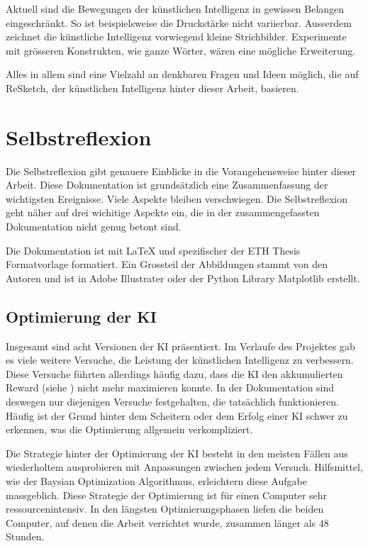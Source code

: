 Aktuell sind die Bewegungen der künstlichen Intelligenz in
gewissen Belangen eingeschränkt. So ist beispielsweise die Druckstärke nicht
variierbar. Ausserdem zeichnet die künstliche Intelligenz vorwiegend kleine
Strichbilder. Experimente mit grösseren Konstrukten, wie ganze Wörter, wären
eine mögliche Erweiterung. 

Alles in allem sind eine Vielzahl an denkbaren Fragen und Ideen möglich, die auf
ReSketch, der künstlichen Intelligenz hinter dieser Arbeit, basieren.


\section{Selbstreflexion}\label{chap:d_reflex} Die Selbstreflexion gibt genauere
Einblicke in die Vorangehensweise hinter dieser Arbeit. Diese Dokumentation ist
grundsätzlich eine Zusammenfassung der wichtigsten Ereignisse. Viele Aspekte
bleiben verschwiegen. Die Selbstreflexion geht näher auf drei wichitige Aspekte
ein, die in der zusammengefassten Dokumentation nicht genug betont sind.

Die Dokumentation ist mit LaTeX und spezifischer der ETH Thesis Formatvorlage
\cite{noauthor_cadmo_2014} formatiert. Ein Grossteil der Abbildungen stammt von
den Autoren und ist in Adobe Illustrater oder der Python Library Matplotlib
erstellt.

\subsection{Optimierung der KI}\label{sub:d_reflex_opti} Insgesamt sind acht
Versionen der KI präsentiert. Im Verlaufe des Projektes gab es viele weitere
Versuche, die Leistung der künstlichen Intelligenz zu verbessern. Diese Versuche
führten allerdings häufig dazu, dass die KI den akkumulierten Reward (siehe
) nicht mehr maximieren konnte. In der Dokumentation
sind deswegen nur diejenigen Versuche festgehalten, die tatsächlich
funktionieren. Häufig ist der Grund hinter dem Scheitern oder dem Erfolg einer
KI schwer zu erkennen, was die Optimierung allgemein verkompliziert.

Die Strategie hinter der Optimierung der KI besteht in den meisten Fällen aus
wiederholtem ausprobieren mit Anpassungen zwischen jedem Versuch. Hilfsmittel,
wie der Baysian Optimization Algorithmus, erleichtern diese Aufgabe massgeblich.
Diese Strategie der Optimierung ist für einen Computer sehr ressourcenintensiv.
In den längsten Optimierungsphasen liefen die beiden Computer, auf denen die
Arbeit verrichtet wurde, zusammen länger als $48$ Stunden.

